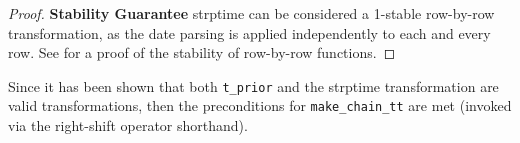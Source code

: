 \documentclass{article}
\begin{document}
\begin{proof}
    \textbf{Stability Guarantee}
    strptime can be considered a 1-stable row-by-row transformation,
    as the date parsing is applied independently to each and every row.
    See  for a proof of the stability of row-by-row functions.
\end{proof}

Since it has been shown that both \texttt{t\_prior} and the strptime transformation are valid transformations,
then the preconditions for \texttt{make\_chain\_tt} are met (invoked via the right-shift operator shorthand).
\end{document}
